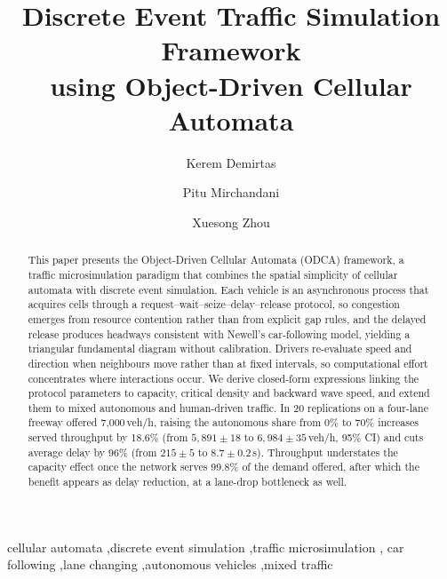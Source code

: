 \documentclass[review,number]{elsarticle}
\begin{document}
\begin{frontmatter}

\title{Discrete Event Traffic Simulation Framework\\using Object-Driven Cellular Automata}

\author[asu]{Kerem Demirtas}
\author[asu]{Pitu Mirchandani}
\author[ssebe]{Xuesong Zhou}


\begin{abstract}
This paper presents the Object-Driven Cellular Automata (ODCA) framework, a traffic microsimulation paradigm that combines the spatial simplicity of cellular automata with discrete event simulation. Each vehicle is an asynchronous process that acquires cells through a request--wait--seize--delay--release protocol, so congestion emerges from resource contention rather than from explicit gap rules, and the delayed release produces headways consistent with Newell's car-following model, yielding a triangular fundamental diagram without calibration. Drivers re-evaluate speed and direction when neighbours move rather than at fixed intervals, so computational effort concentrates where interactions occur. We derive closed-form expressions linking the protocol parameters to capacity, critical density and backward wave speed, and extend them to mixed autonomous and human-driven traffic. In 20 replications on a four-lane freeway offered 7{,}000\,veh/h, raising the autonomous share from 0\% to 70\% increases served throughput by 18.6\% (from $5{,}891 \pm 18$ to $6{,}984 \pm 35$\,veh/h, 95\% CI) and cuts average delay by 96\% (from $215 \pm 5$ to $8.7 \pm 0.2$\,s). Throughput understates the capacity effect once the network serves 99.8\% of the demand offered, after which the benefit appears as delay reduction, at a lane-drop bottleneck as well.
\end{abstract}

\begin{keyword}
cellular automata \sep discrete event simulation \sep traffic microsimulation \sep
car following \sep lane changing \sep autonomous vehicles \sep mixed traffic
\end{keyword}

\end{frontmatter}
\end{document}
